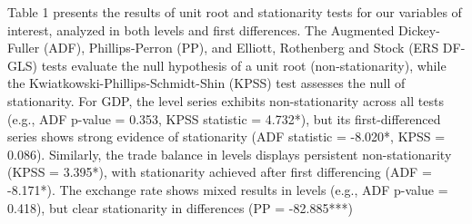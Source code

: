 \documentclass[
]{article}
\begin{document}
	Table 1 presents the results of unit root and stationarity tests for our variables of interest, 
	analyzed in both levels and first differences. The Augmented 
	Dickey-Fuller (ADF), Phillips-Perron (PP), and Elliott, Rothenberg and Stock (ERS DF-GLS) tests evaluate the 
	null hypothesis of a unit root (non-stationarity), while the Kwiatkowski-Phillips-Schmidt-Shin (KPSS) test assesses 
	the null of stationarity. For GDP, the level series exhibits non-stationarity 
	across all tests (e.g., ADF p-value = 0.353, KPSS statistic = 4.732*), but its 
	first-differenced series shows strong evidence of stationarity (ADF statistic =
	-8.020*, KPSS = 0.086). Similarly, the trade balance in levels displays 
	persistent non-stationarity (KPSS = 3.395*), with stationarity achieved after 
	first differencing (ADF = -8.171*). The exchange rate shows mixed results in 
	levels (e.g., ADF p-value = 0.418), but clear stationarity in differences
	(PP = -82.885***)
	
\end{document}
